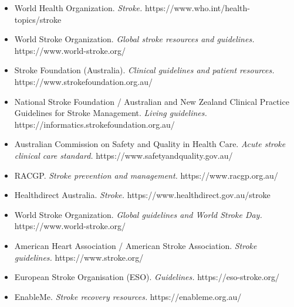 \begin{itemize}
    \item World Health Organization. \textit{Stroke.} https://www.who.int/health-topics/stroke
    \item World Stroke Organization. \textit{Global stroke resources and guidelines.} https://www.world-stroke.org/
    \item Stroke Foundation (Australia). \textit{Clinical guidelines and patient resources.} https://www.strokefoundation.org.au/
    \item National Stroke Foundation / Australian and New Zealand Clinical Practice Guidelines for Stroke Management. \textit{Living guidelines.} https://informatics.strokefoundation.org.au/
    \item Australian Commission on Safety and Quality in Health Care. \textit{Acute stroke clinical care standard.} https://www.safetyandquality.gov.au/
    \item RACGP. \textit{Stroke prevention and management.} https://www.racgp.org.au/
    \item Healthdirect Australia. \textit{Stroke.} https://www.healthdirect.gov.au/stroke
    \item World Stroke Organization. \textit{Global guidelines and World Stroke Day.} https://www.world-stroke.org/
    \item American Heart Association / American Stroke Association. \textit{Stroke guidelines.} https://www.stroke.org/
    \item European Stroke Organisation (ESO). \textit{Guidelines.} https://eso-stroke.org/
    \item EnableMe. \textit{Stroke recovery resources.} https://enableme.org.au/
\end{itemize}
